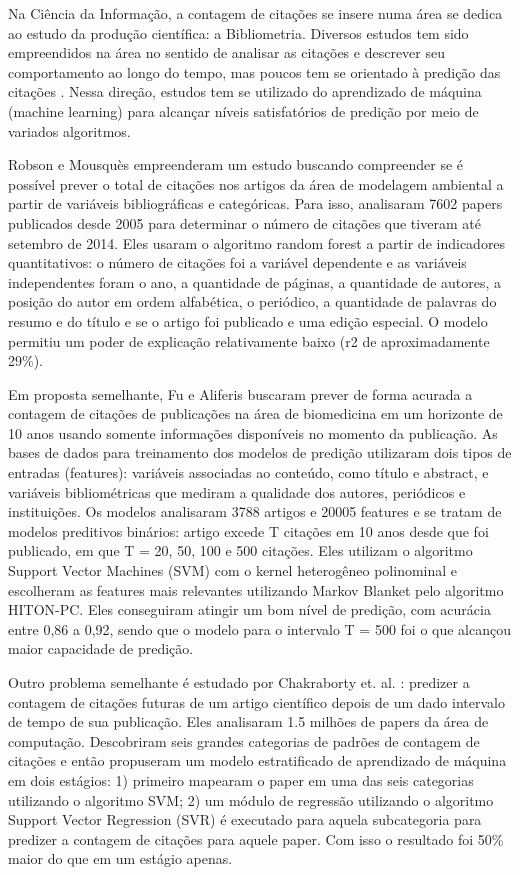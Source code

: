 \documentclass[runningheads]{llncs}
\begin{document}
Na Ciência da Informação, a contagem de citações se insere numa área se dedica ao estudo da produção científica: a Bibliometria. Diversos estudos tem sido empreendidos na área no sentido de analisar as citações e descrever seu comportamento ao longo do tempo, mas poucos tem se orientado à predição das citações \cite{Fu2010}. Nessa direção, estudos tem se utilizado do aprendizado de máquina (machine learning) para alcançar níveis satisfatórios de predição por meio de variados algoritmos.

Robson e Mousquès \cite{Robson2016} empreenderam um estudo buscando compreender se é possível prever o total de citações nos artigos da área de modelagem ambiental a partir de variáveis bibliográficas e categóricas. Para isso, analisaram 7602 papers publicados desde 2005 para determinar o número de citações que tiveram até setembro de 2014. Eles usaram o algoritmo random forest a partir de indicadores quantitativos: o número de citações foi a variável dependente e as variáveis independentes foram o ano, a quantidade de páginas, a quantidade de autores, a posição do autor em ordem alfabética, o periódico, a quantidade de palavras do resumo e do título e se o artigo foi publicado e uma edição especial. O modelo permitiu um poder de explicação relativamente baixo (r2 de aproximadamente 29\%).

Em proposta semelhante, Fu e Aliferis \cite{Fu2010} buscaram prever de forma acurada a contagem de citações de publicações na área de biomedicina em um horizonte de 10 anos usando somente informações disponíveis no momento da publicação. As bases de dados para treinamento dos modelos de predição utilizaram dois tipos de entradas (features): variáveis associadas ao conteúdo, como título e abstract, e variáveis bibliométricas que mediram a qualidade dos autores, periódicos e instituições. Os modelos analisaram 3788 artigos e 20005 features e se tratam de modelos preditivos binários: artigo excede T citações em 10 anos desde que foi publicado, em que T = 20, 50, 100 e 500 citações. Eles utilizam o algoritmo Support Vector Machines (SVM) com o kernel heterogêneo polinominal e escolheram as features mais relevantes utilizando Markov Blanket pelo algoritmo HITON-PC. Eles conseguiram atingir um bom nível de predição, com acurácia entre 0,86 a 0,92, sendo que o modelo para o intervalo T = 500 foi o que alcançou maior capacidade de predição.

Outro problema semelhante é estudado por Chakraborty et. al. \cite{Chakraborty2014}: predizer a contagem de citações futuras de um artigo científico depois de um dado intervalo de tempo de sua publicação. Eles analisaram 1.5 milhões de papers da área de computação. Descobriram seis grandes categorias de padrões de contagem de citações e então propuseram um modelo estratificado de aprendizado de máquina em dois estágios: 1) primeiro mapearam o paper em uma das seis categorias utilizando o algoritmo SVM; 2) um módulo de regressão utilizando o algoritmo Support Vector Regression (SVR) é executado para aquela subcategoria para predizer a contagem de citações para aquele paper. Com isso o resultado foi 50\% maior do que em um estágio apenas.
\end{document}
